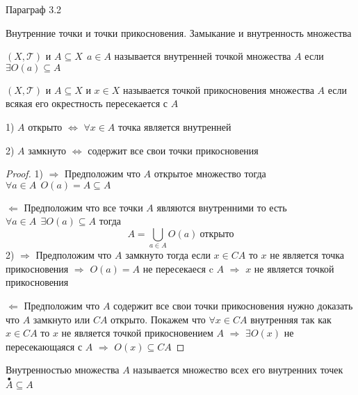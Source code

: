 \begin{title}[\Large]
  Параграф 3.2
\end{title}

\begin{title}[\Large]
  Внутренние точки и точки прикосновения. Замыкание и внутренность множества
\end{title}

\begin{define}
  $(X, \mathcal{T})$ и $A \subseteq X ~~ a \in A$ называется внутренней точкой
  множества $A$ если $\exists O(a) \subseteq A$
\end{define}

\begin{define}
  $(X, \mathcal{T})$  и $A \subseteq X$ и $x \in X$ называется точкой
  прикосновения множества $A$
  если всякая его окрестность пересекается с $A$
\end{define}

\begin{theorem}
  1) $A$ открыто $\Leftrightarrow$ $\forall x \in A$ точка является
  внутренней

  2) $A$ замкнуто $\Leftrightarrow$ содержит все свои точки
  прикосновения
\end{theorem}

\begin{proof}
  1) $\Rightarrow$ Предположим что $A$ открытое множество тогда $\forall a \in A
  ~~ O(a) = A \subseteq A$

  $\Leftarrow$ Предположим что все точки $A$ являются внутренними то есть
  $\forall a \in A ~~ \exists O(a) \subseteq A$ тогда
  $$
  A = \bigcup_{a \in A} O(a) ~ \text{открыто}
  $$
  2) $\Rightarrow$ Предположим что $A$ замкнуто тогда если $x \in CA$
  то $x$ не является точка прикосновения $\Rightarrow$ $O(a) = A$ не пересекаеся
  c $A$  $\Rightarrow$ $x$ не является точкой прикосновения

  $\Leftarrow$ Предположим что $A$ содержит все свои точки прикосновения нужно
  доказать что $A$ замкнуто или $CA$ открыто. Покажем что $\forall x \in CA$
  внутренняя так как
  $x \in CA$ то $x$ не является точкой прикосновением $A$ $\Rightarrow$
  $\exists O(x)$ не пересекающаяся с $A$ $\Rightarrow$ $O(x) \subseteq CA$
\end{proof}

\begin{define}
  Внутренностью множества $A$ называется множество всех его внутренних точек
  $\stackrel{\bullet}{A} \subseteq A$
\end{define}

